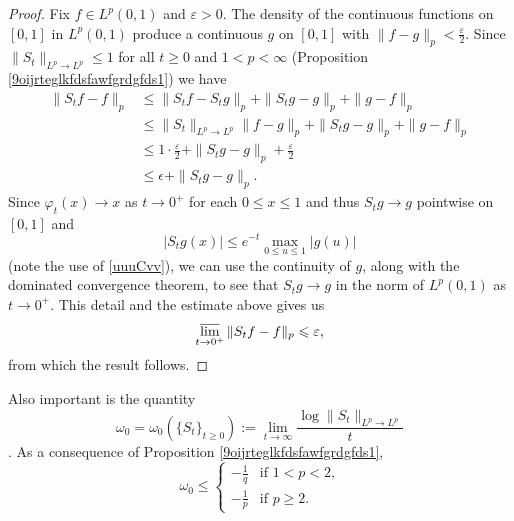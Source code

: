 \documentclass[11pt]{amsart}
\numberwithin{equation}{section}
\theoremstyle{plain}
\newtheorem{Corollary}[equation]{Corollary}
\theoremstyle{definition}
\renewcommand{\leq}{\leqslant}
\renewcommand{\geq}{\geqslant}
\renewcommand{\phi}{\varphi}
\newcommand{\0}{{\color{lightgray}0}}
\begin{document}
\begin{proof}
Fix $f \in L^p(0, 1)$ and $\varepsilon > 0$. The density of the continuous functions on $[0, 1]$ in $L^p(0, 1)$ produce a continuous $g$ on $[0, 1]$ with $\|f - g\|_p <  \frac{\varepsilon}{2}$. Since $\|S_{t}\|_{L^p \to L^p} \leq 1$ for all $t \geq 0$ and $1 < p < \infty$ (Proposition \ref{9oijrteglkfdsfawfgrdgfds1})  we have 
\begin{align*}
\|S_{t} f - f\|_p & \leq \|S_{t} f - S_{t} g\|_p + \|S_{t} g - g\|_p + \|g - f\|_p\\
& \leq \|S_{t}\|_{L^p \to L^p} \|f - g\|_p + \|S_{t} g - g\|_p + \|g - f\|_p\\
& \leq 1 \cdot  \tfrac{\varepsilon}{2} + \|S_{t} g - g\|_p + \tfrac{\varepsilon}{2}\\
& \leq \epsilon +  \|S_{t} g - g\|_p.
\end{align*}
Since $\phi_{t}(x) \to x$ as $t \to 0^{+}$ for each $0 \leq x \leq 1$ and thus $S_{t} g \to g$ pointwise on $[0, 1]$ and 
$$|S_{t} g(x)| \leq e^{-t} \max_{0 \leq u \leq 1} |g(u)|$$
(note the use of \eqref{uuuCvv}), we can use the continuity of $g$, along with the dominated convergence theorem, to see that 
 $S_{t} g \to g$ in the norm of  $L^p(0, 1)$ as $t \to 0^{+}$. This detail and the estimate above gives us 
$$\varlimsup_{t \to 0^{+}} \|S_{t} f - f\|_p \leq \varepsilon,$$ from which the result  follows. 
\end{proof}

Also important is the quantity
$$\omega_{0} = \omega_0(\{S_t\}_{t \geq 0}) := \lim_{t \to \infty} \frac{\log \|S_t\|_{L^p \to L^p}}{t}$$
 \cite[p.~251]{MR1721989}. As a consequence of Proposition \ref{9oijrteglkfdsfawfgrdgfds1}, 
\begin{equation}\label{www000}
\omega_0 \leq \begin{cases}
-\frac{1}{q}& \mbox{if $1 < p < 2$,}\\[4pt]
-\frac{1}{p} &\mbox{if $p \geq 2$.}
\end{cases}
\end{equation}


\end{document}
